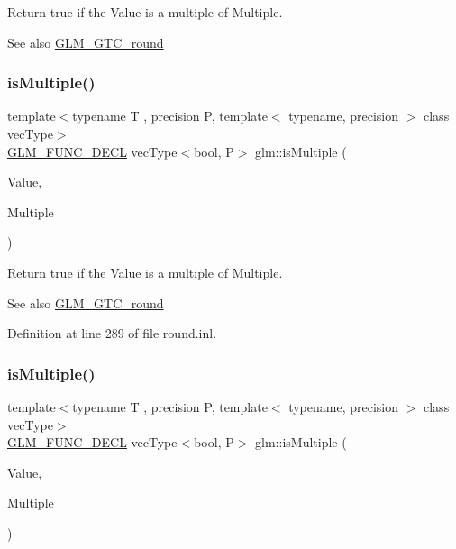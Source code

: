 Return true if the \textquotesingle{}Value\textquotesingle{} is a multiple of \textquotesingle{}Multiple\textquotesingle{}.

\begin{DoxySeeAlso}{See also}
\mbox{\hyperlink{group__gtc__round}{G\+L\+M\+\_\+\+G\+T\+C\+\_\+round}} 
\end{DoxySeeAlso}
\mbox{\label{group__gtc__round_ga50ea5d5dc33fffba39ad6002a3784123}} 
\subsubsection{\texorpdfstring{isMultiple()}{isMultiple()}\hspace{0.1cm}{\footnotesize\ttfamily [2/3]}}
{\footnotesize\ttfamily template$<$typename T , precision P, template$<$ typename, precision $>$ class vec\+Type$>$ \\
\mbox{\hyperlink{setup_8hpp_ab2d052de21a70539923e9bcbf6e83a51}{G\+L\+M\+\_\+\+F\+U\+N\+C\+\_\+\+D\+E\+CL}} vec\+Type$<$bool, P$>$ glm\+::is\+Multiple (\begin{DoxyParamCaption}\item[{vec\+Type$<$ T, P $>$ const \&}]{Value,  }\item[{T}]{Multiple }\end{DoxyParamCaption})}

Return true if the \textquotesingle{}Value\textquotesingle{} is a multiple of \textquotesingle{}Multiple\textquotesingle{}.

\begin{DoxySeeAlso}{See also}
\mbox{\hyperlink{group__gtc__round}{G\+L\+M\+\_\+\+G\+T\+C\+\_\+round}} 
\end{DoxySeeAlso}


Definition at line 289 of file round.\+inl.

\mbox{\label{group__gtc__round_ga7ae705574ef3e3ebfb4f537d8d285c48}} 
\subsubsection{\texorpdfstring{isMultiple()}{isMultiple()}\hspace{0.1cm}{\footnotesize\ttfamily [3/3]}}
{\footnotesize\ttfamily template$<$typename T , precision P, template$<$ typename, precision $>$ class vec\+Type$>$ \\
\mbox{\hyperlink{setup_8hpp_ab2d052de21a70539923e9bcbf6e83a51}{G\+L\+M\+\_\+\+F\+U\+N\+C\+\_\+\+D\+E\+CL}} vec\+Type$<$bool, P$>$ glm\+::is\+Multiple (\begin{DoxyParamCaption}\item[{vec\+Type$<$ T, P $>$ const \&}]{Value,  }\item[{vec\+Type$<$ T, P $>$ const \&}]{Multiple }\end{DoxyParamCaption})}

